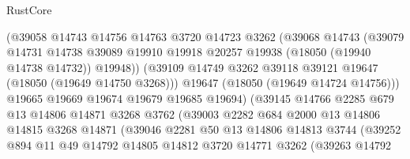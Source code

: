 \begin{lexlean}{RustCore}
\begin{coremodule}
                          (@39058
                            @14743
                            @14756
                            @14763
                            @3720
                            @14723
                            @3262
                            (@39068
                              @14743
                              (@39079
                                @14731
                                @14738
                                @39089
                                @19910
                                @19918
                                @20257
                                @19938
                                (@18050 (@19940 @14738 @14732))
                                @19948))
                            (@39109
                              @14749
                              @3262
                              @39118
                              @39121
                              @19647
                              (@18050 (@19649 @14750 @3268)))
                            @19647
                            (@18050 (@19649 @14724 @14756)))
                          @19665
                          @19669
                          @19674
                          @19679
                          @19685
                          @19694)
                        (@39145
                          @14766
                          @2285
                          @679
                          @13
                          @14806
                          @14871
                          @3268
                          @3762
                          (@39003
                            @2282
                            @684
                            @2000
                            @13
                            @14806
                            @14815
                            @3268
                            @14871
                            (@39046
                              @2281
                              @50
                              @13
                              @14806
                              @14813
                              @3744
                              (@39252
                                @894
                                @11
                                @49
                                @14792
                                @14805
                                @14812
                                @3720
                                @14771
                                @3262
                                (@39263
                                  @14792

\end{coremodule}
\end{lexlean}
